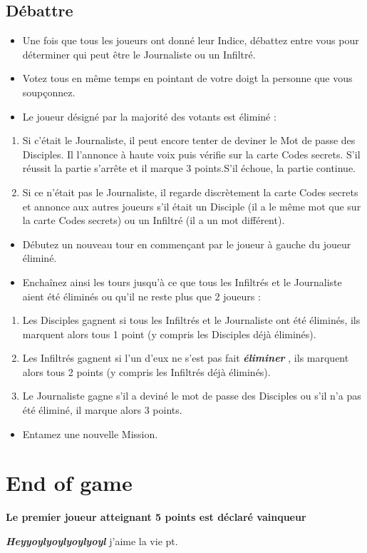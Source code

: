 \documentclass{article}%
\begin{document}
%
\subsection{ Débattre
}%
\label{subsec:Dbattre}%
\begin{itemize}%
\item%
%
  Une fois que tous les joueurs ont donné leur Indice, débattez entre vous pour déterminer qui peut être le Journaliste ou un Infiltré.
%
\item%
%
  Votez tous en même temps en pointant de votre doigt la personne que vous soupçonnez.
%
\item%
%
  Le joueur désigné par la majorité des votants est éliminé :
%
\end{itemize}%
\begin{enumerate}%
\item%
%
  Si c’était le Journaliste, il peut encore tenter de deviner le Mot de passe des Disciples. Il l'annonce à haute voix puis vérifie sur la carte Codes secrets. S’il réussit la partie s’arrête et il marque 3 points.S’il échoue, la partie continue.
%
\item%
%
  Si ce n’était pas le Journaliste, il regarde discrètement la carte Codes secrets et annonce aux autres joueurs s’il était un Disciple (il a le même mot que sur la carte Codes secrets) ou un Infiltré (il a un mot différent).
%
\end{enumerate}%
\begin{itemize}%
\item%
%
  Débutez un nouveau tour en commençant par le joueur à gauche du joueur éliminé.
%
\item%
%
  Enchaînez ainsi les tours jusqu’à ce que tous les Infiltrés et le Journaliste aient été éliminés ou qu’il ne reste plus que 2 joueurs :
%
\end{itemize}%
\begin{enumerate}%
\item%
%
  Les Disciples gagnent si tous les Infiltrés et le Journaliste ont été éliminés, ils marquent alors tous 1 point (y compris les Disciples déjà éliminés).
%
\item%
%
  Les Infiltrés gagnent si l'un d'eux ne s'est pas fait %
\textbf{\textit{éliminer}}%
  , ils marquent alors tous 2 points (y compris les Infiltrés déjà éliminés).
%
\item%
%
  Le Journaliste gagne s'il a deviné le mot de passe des Disciples ou s'il n'a pas été éliminé, il marque alors 3 points.
%
\end{enumerate}%
\begin{itemize}%
\item%
%
  Entamez une nouvelle Mission.
%
\end{itemize}

%
\section{ End of game
}%
\label{sec:Endofgame}%
\textbf{Le premier joueur atteignant 5 points est déclaré vainqueur}%

%
\textbf{\textit{Heyyoylyoylyoylyoyl}}%
  j'aime la vie pt.

%
\end{document}
